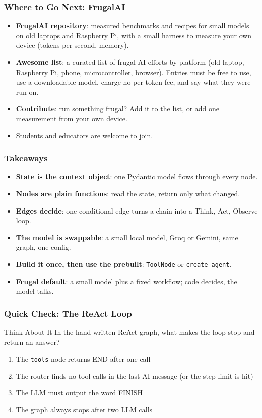 \begin{frame}[fragile]\frametitle{Where to Go Next: FrugalAI}
      \begin{itemize}
        \item \textbf{FrugalAI repository}: measured benchmarks and recipes for small models on old laptops and Raspberry Pi, with a small harness to measure your own device (tokens per second, memory).
        \item \textbf{Awesome list}: a curated list of frugal AI efforts by platform (old laptop, Raspberry Pi, phone, microcontroller, browser). Entries must be free to use, use a downloadable model, charge no per-token fee, and say what they were run on.
        \item \textbf{Contribute}: run something frugal? Add it to the list, or add one measurement from your own device.
        \item Students and educators are welcome to join.
      \end{itemize}
\end{frame}

\begin{frame}[fragile]\frametitle{Takeaways}
      \begin{itemize}
        \item \textbf{State is the context object}: one Pydantic model flows through every node.
        \item \textbf{Nodes are plain functions}: read the state, return only what changed.
        \item \textbf{Edges decide}: one conditional edge turns a chain into a Think, Act, Observe loop.
        \item \textbf{The model is swappable}: a small local model, Groq or Gemini, same graph, one config.
        \item \textbf{Build it once, then use the prebuilt}: \texttt{ToolNode} or \texttt{create\_agent}.
        \item \textbf{Frugal default}: a small model plus a fixed workflow; code decides, the model talks.
      \end{itemize}
\end{frame}

\begin{frame}[fragile]\frametitle{Quick Check: The ReAct Loop}
\begin{block}{Think About It}
In the hand-written ReAct graph, what makes the loop stop and return an answer?
\begin{enumerate}
  \item[A.] The \texttt{tools} node returns END after one call
  \item[B.] The router finds no tool calls in the last AI message (or the step limit is hit)
  \item[C.] The LLM must output the word FINISH
  \item[D.] The graph always stops after two LLM calls
\end{enumerate}
\end{block}
\end{frame}


